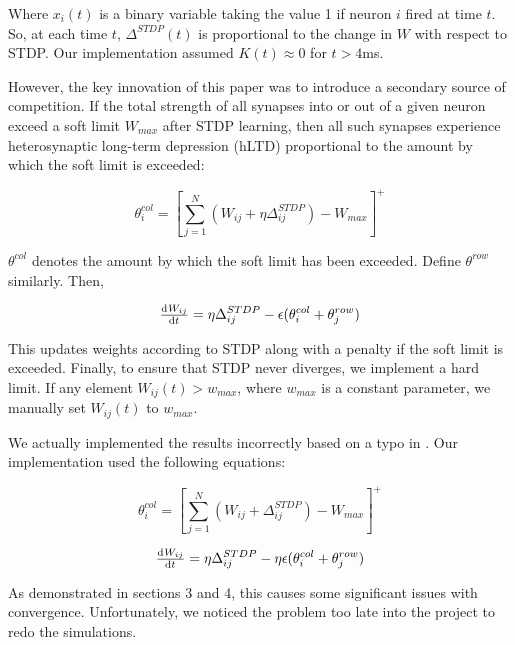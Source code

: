 Where \(x_i(t)\) is a binary variable taking the value 1 if neuron \(i\) fired at time \(t\). So, at each time \(t\), \(\Delta^{STDP}(t)\) is proportional to the change in \(W\) with respect to STDP. Our implementation assumed \(K(t) \approx 0\) for \(t > 4\)ms.

However, the key innovation of this paper was to introduce a secondary source of competition. If the total strength of all synapses into or out of a given neuron exceed a soft limit \(W_{max}\) after STDP learning, then all such synapses experience heterosynaptic long-term depression (hLTD) proportional to the amount by which the soft limit is exceeded:

\begin{equation}
\theta^{col}_i =  \left[\sum_{j=1}^N (W_{ij} + \eta\Delta^{STDP}_{ij}) - W_{max}\right]^+
\label{hLTD}
\end{equation}

\(\theta^{col}\) denotes the amount by which the soft limit has been exceeded. Define \(\theta^{row}\) similarly. Then,

\begin{equation}
\od{W_{ij}}{t} = \eta\Delta^{STDP}_{ij} - \epsilon(\theta^{col}_i + \theta^{row}_j)
\label{Learning}
\end{equation}

This updates weights according to STDP along with a penalty if the soft limit is exceeded. Finally, to ensure that STDP never diverges, we implement a hard limit. If any element \(W_{ij}(t) > w_{max}\), where \(w_{max}\) is a constant parameter, we manually set \(W_{ij}(t)\) to \(w_{max}\). 

We actually implemented the results incorrectly based on a typo in \cite{Fiete}. Our implementation used the following equations:

\begin{equation}
\theta^{col}_i =  \left[\sum_{j=1}^N (W_{ij} + \Delta^{STDP}_{ij}) - W_{max}\right]^+
\label{hLTD-wrong}
\end{equation}

\begin{equation}
\od{W_{ij}}{t} = \eta\Delta^{STDP}_{ij} - \eta\epsilon(\theta^{col}_i + \theta^{row}_j)
\label{Learning-wrong}
\end{equation}

As demonstrated in sections 3 and 4, this causes some significant issues with convergence. Unfortunately, we noticed the problem too late into the project to redo the simulations.

